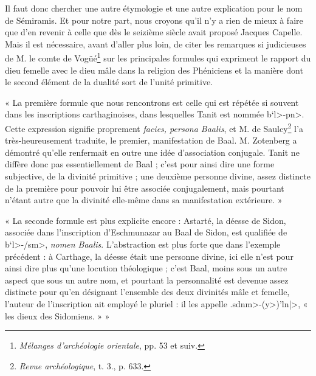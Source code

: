 \documentclass[a4paper, 11pt, oneside]{article}
\begin{document}
Il faut donc chercher une autre étymologie et une autre explication pour le nom de Sémiramis. Et pour notre part, nous croyons qu'il n'y a rien de mieux à faire que d'en revenir à celle que dès le seizième siècle avait proposé Jacques Capelle. Mais il est nécessaire, avant d'aller plus loin, de citer les remarques si judicieuses de M. le comte de Vogüé\footnote{\emph{Mélanges d'archéologie orientale}, pp. 53 et suiv.} sur les principales formules qui expriment le rapport du dieu femelle avec le dieu mâle dans la religion des Phéniciens et la manière dont le second élément de la dualité sort de l'unité primitive.

« La première formule que nous rencontrons est celle qui est répétée si souvent dans les inscriptions carthaginoises, dans lesquelles Tanit est nommée \<b`l>-\<pn>. Cette expression signifie proprement \emph{facies, persona Baalis}, et M. de Saulcy\footnote{\emph{Revue archéologique}, t. 3., p. 633.} l'a très-heureusement traduite, le premier, manifestation de Baal. M. Zotenberg a démontré qu'elle renfermait en outre une idée d'association conjugale. Tanit ne diffère donc pas essentiellement de Baal ; c'est pour ainsi dire une forme subjective, de la divinité primitive ; une deuxième personne divine, assez distincte de la première pour pouvoir lui être associée conjugalement, mais pourtant n'étant autre que la divinité elle-même dans sa manifestation extérieure. »

« La seconde formule est plus explicite encore : Astarté, la déesse de Sidon, associée dans l'inscription d'Eschmunazar au Baal de Sidon, est qualifiée de \<b`l>-\</sm>, \emph{nomen Baalis}. L'abstraction est plus forte que dans l'exemple précédent : à Carthage, la déesse était une personne divine, ici elle n'est pour ainsi dire plus qu'une locution théologique ; c'est Baal, moins sous un autre aspect que sous un autre nom, et pourtant la personnalité est devenue assez distincte pour qu'en désignant l'ensemble des deux divinités mâle et femelle, l'auteur de l'inscription ait employé le pluriel : il les appelle \<.sdnm>-(\<y>)\<'ln|>, « les dieux des Sidomiens. » »
\end{document}
